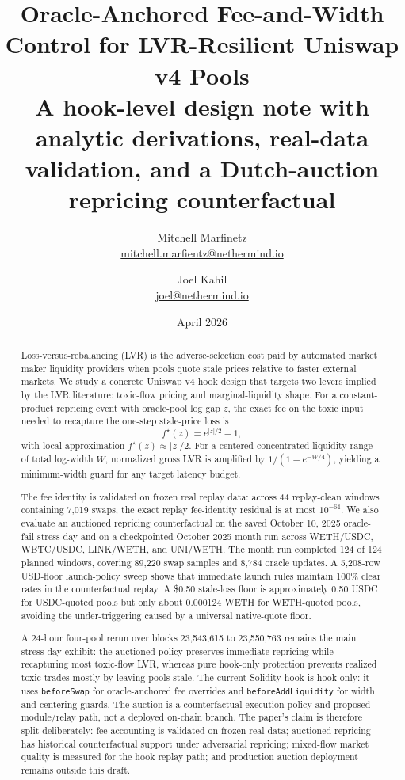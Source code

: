 \documentclass[11pt]{article}
\title{Oracle-Anchored Fee-and-Width Control for LVR-Resilient Uniswap v4 Pools\\
\large A hook-level design note with analytic derivations, real-data validation, and a Dutch-auction repricing counterfactual}
\author{Mitchell Marfinetz\\
\href{mailto:mitchell.marfientz@nethermind.io}{mitchell.marfientz@nethermind.io}
\and
Joel Kahil\\
\href{mailto:joel@nethermind.io}{joel@nethermind.io}}
\date{April 2026}
\begin{document}
\maketitle

\begin{abstract}
Loss-versus-rebalancing (LVR) is the adverse-selection cost paid by automated market maker liquidity providers when pools quote stale prices relative to faster external markets. We study a concrete Uniswap v4 hook design that targets two levers implied by the LVR literature: toxic-flow pricing and marginal-liquidity shape. For a constant-product repricing event with oracle-pool log gap $z$, the exact fee on the toxic input needed to recapture the one-step stale-price loss is
\[
  f^\star(z) = e^{|z|/2} - 1,
\]
with local approximation $f^\star(z) \approx |z|/2$. For a centered concentrated-liquidity range of total log-width $W$, normalized gross LVR is amplified by $1/(1-e^{-W/4})$, yielding a minimum-width guard for any target latency budget.

The fee identity is validated on frozen real replay data: across 44 replay-clean windows containing 7,019 swaps, the exact replay fee-identity residual is at most $10^{-64}$. We also evaluate an auctioned repricing counterfactual on the saved October 10, 2025 oracle-fail stress day and on a checkpointed October 2025 month run across WETH/USDC, WBTC/USDC, LINK/WETH, and UNI/WETH. The month run completed 124 of 124 planned windows, covering 89,220 swap samples and 8,784 oracle updates. A 5,208-row USD-floor launch-policy sweep shows that immediate launch rules maintain 100\% clear rates in the counterfactual replay. A \$0.50 stale-loss floor is approximately 0.50 USDC for USDC-quoted pools but only about 0.000124 WETH for WETH-quoted pools, avoiding the under-triggering caused by a universal native-quote floor.

A 24-hour four-pool rerun over blocks 23,543,615 to 23,550,763 remains the main stress-day exhibit: the auctioned policy preserves immediate repricing while recapturing most toxic-flow LVR, whereas pure hook-only protection prevents realized toxic trades mostly by leaving pools stale. The current Solidity hook is hook-only: it uses \texttt{beforeSwap} for oracle-anchored fee overrides and \texttt{beforeAddLiquidity} for width and centering guards. The auction is a counterfactual execution policy and proposed module/relay path, not a deployed on-chain branch. The paper's claim is therefore split deliberately: fee accounting is validated on frozen real data; auctioned repricing has historical counterfactual support under adversarial repricing; mixed-flow market quality is measured for the hook replay path; and production auction deployment remains outside this draft.
\end{abstract}
\end{document}
